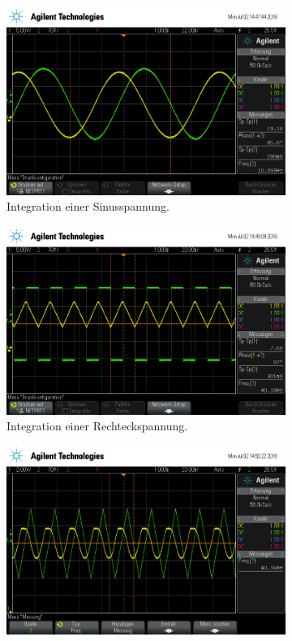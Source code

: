 \begin{figure}[ht]
  \centering
  \begin{subfigure}[]{\textwidth}
    \centering
    \includegraphics[height=0.3\textheight]{data/scope_262.png}
    \caption{Integration einer Sinusspannung.}
    \label{subfig:int_sinus}
  \end{subfigure}
  \begin{subfigure}[]{\textwidth}
    \centering
    \includegraphics[height=0.3\textheight]{data/scope_263.png}
    \caption{Integration einer Rechteckspannung.}
    \label{subfig:int_rechteck}
  \end{subfigure}
  \begin{subfigure}[]{\textwidth}
    \centering
    \includegraphics[height=0.3\textheight]{data/scope_264.png}

\end{subfigure}
\end{figure}
